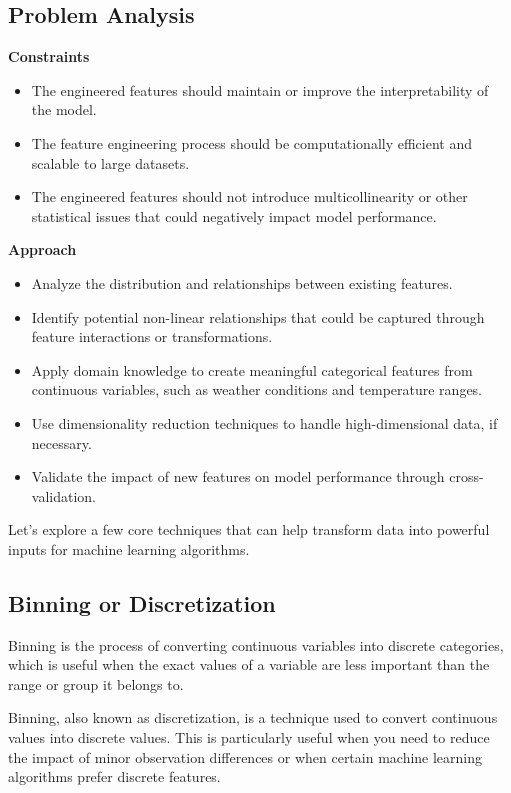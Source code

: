 \documentclass{article}
\begin{document}
\subsection*{Problem Analysis}
\textbf{Constraints}
\begin{itemize}
    \item The engineered features should maintain or improve the interpretability of the model.
    \item The feature engineering process should be computationally efficient and scalable to large datasets.
    \item The engineered features should not introduce multicollinearity or other statistical issues that could negatively impact model performance.
\end{itemize}

\textbf{Approach}
\begin{itemize}
    \item Analyze the distribution and relationships between existing features.
    \item Identify potential non-linear relationships that could be captured through feature interactions or transformations.
    \item Apply domain knowledge to create meaningful categorical features from continuous variables, such as weather conditions and temperature ranges.
    \item Use dimensionality reduction techniques to handle high-dimensional data, if necessary.
    \item Validate the impact of new features on model performance through cross-validation.
\end{itemize}

Let’s explore a few core techniques that can help transform data into powerful inputs for machine learning algorithms.

\subsection{Binning or Discretization}
Binning is the process of converting continuous variables into discrete categories, which is useful when the exact values of a variable are less important than the range or group it belongs to.

Binning, also known as discretization, is a technique used to convert continuous values into discrete values. This is particularly useful when you need to reduce the impact of minor observation differences or when certain machine learning algorithms prefer discrete features.
\end{document}
